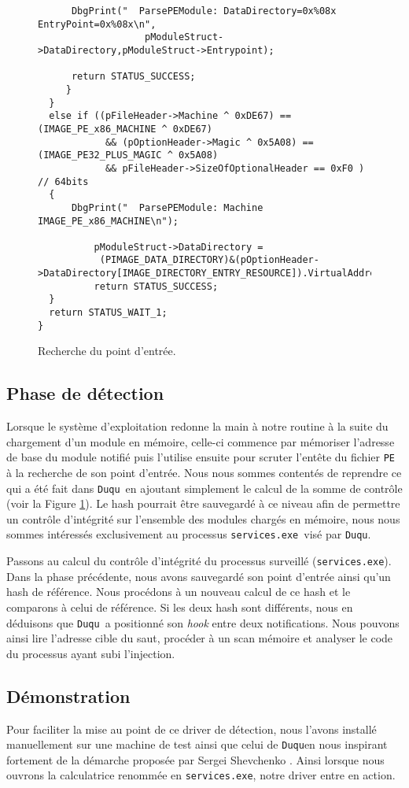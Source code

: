 \documentclass[times,11pt,fullpage]{article}
\newcommand{\Duqu}{\texttt{Duqu}}
\newcommand{\service}{\texttt{services.exe}}
\begin{document}
\begin{figure}
\begin{verbatim}
	  DbgPrint("  ParsePEModule: DataDirectory=0x%08x EntryPoint=0x%08x\n",
                   pModuleStruct->DataDirectory,pModuleStruct->Entrypoint);

	  return STATUS_SUCCESS; 
     }
  }
  else if ((pFileHeader->Machine ^ 0xDE67) == (IMAGE_PE_x86_MACHINE ^ 0xDE67) 
            && (pOptionHeader->Magic ^ 0x5A08) == (IMAGE_PE32_PLUS_MAGIC ^ 0x5A08) 
            && pFileHeader->SizeOfOptionalHeader == 0xF0 ) // 64bits
  {
	  DbgPrint("  ParsePEModule: Machine IMAGE_PE_x86_MACHINE\n");

          pModuleStruct->DataDirectory = 
           (PIMAGE_DATA_DIRECTORY)&(pOptionHeader->DataDirectory[IMAGE_DIRECTORY_ENTRY_RESOURCE]).VirtualAddress; 
          return STATUS_SUCCESS; 
  }
  return STATUS_WAIT_1;
}
\end{verbatim}
\caption{Recherche du point d'entrée.\label{fig:ParsePEModule}}
\end{figure}


\subsection{Phase de détection}
Lorsque le système d'exploitation redonne la main à notre routine à la suite du chargement d'un module en mémoire, celle-ci commence par mémoriser l'adresse de base du module notifié puis l'utilise ensuite pour scruter l'entête du fichier \texttt{PE} à la recherche de son point d'entrée. Nous nous sommes contentés de reprendre ce qui a été fait dans \Duqu\ en ajoutant simplement le calcul de la somme de contrôle (voir la Figure \ref{fig:ParsePEModule}). Le hash pourrait être sauvegardé à ce niveau afin de permettre un contrôle d'intégrité sur l'ensemble des modules chargés en mémoire, nous nous sommes intéressés exclusivement au processus \service\ visé par \Duqu.

Passons au calcul du contrôle d'intégrité du processus surveillé (\service). Dans la phase précédente, nous avons sauvegardé son point d'entrée ainsi qu'un hash de référence. Nous procédons à un nouveau calcul de ce hash et le comparons à celui de référence. Si les deux hash sont différents, nous en déduisons que \Duqu\ a positionné son \emph{hook} entre deux notifications. Nous pouvons ainsi lire l'adresse cible du saut, procéder à un scan mémoire et analyser le code du processus ayant subi l'injection.    

\subsection{Démonstration}
Pour faciliter la mise au point de ce driver de détection, nous l'avons installé manuellement sur une machine de test ainsi que celui de \Duqu\space en nous inspirant fortement de la démarche proposée par Sergei Shevchenko \cite{FSabatier_SShevchenko}. Ainsi lorsque nous ouvrons la calculatrice renommée en \service , notre driver entre en action.
\end{document}
